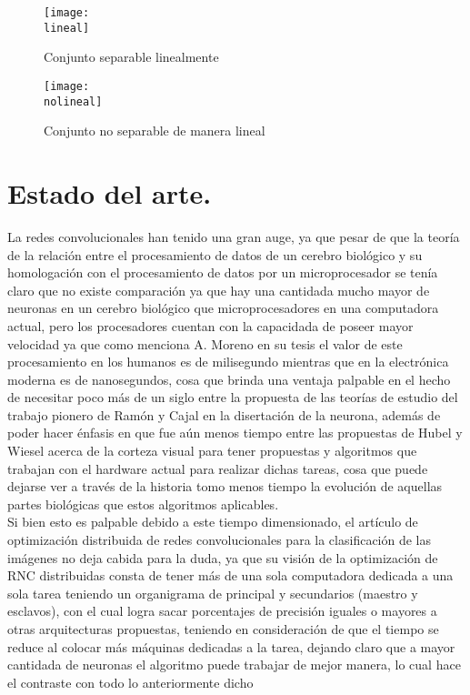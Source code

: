 \documentclass[a4paper, 12pt]{article}
\newcommand{\lineal}{img/lineal.png}
\newcommand{\nolineal}{img/nol.png}
\begin{document}
    \begin{figure}[H]
        \centering
        \texttt{[image: \\lineal]}
        \caption{Conjunto separable linealmente}
        \label{fig:lin}
    \end{figure}

    \begin{figure}[H]
        \centering
        \texttt{[image: \\nolineal]}
        \caption{Conjunto no separable de manera lineal}
        \label{fig:nolin}
    \end{figure}

    \section{Estado del arte.}
    La redes convolucionales han tenido una gran auge, ya que pesar de que la teoría de la relación entre el procesamiento de datos de un cerebro biológico y su homologación con el procesamiento de datos por un microprocesador se tenía claro que no existe comparación ya que hay una cantidada mucho mayor de neuronas en un cerebro biológico que microprocesadores en una computadora actual, pero los procesadores cuentan con la capacidada de poseer mayor velocidad ya que como menciona A. Moreno en su tesis el valor de este procesamiento en los humanos es de milisegundo mientras que en la electrónica moderna es de nanosegundos, cosa que brinda una ventaja palpable en el hecho de necesitar poco más de un siglo entre la propuesta de las teorías de estudio del trabajo pionero de Ramón y Cajal en la disertación de la neurona, además de poder hacer énfasis en que fue aún menos tiempo entre las propuestas de Hubel y Wiesel acerca de la corteza visual para tener propuestas y algoritmos que trabajan con el hardware actual para realizar dichas tareas, cosa que puede dejarse ver a través de la historia tomo menos tiempo la evolución de aquellas partes biológicas que estos algoritmos aplicables\cite{artola2019clasificacion}.\\
    Si bien esto es palpable debido a este tiempo dimensionado, el artículo de optimización distribuida de redes convolucionales para la clasificación de las imágenes no deja cabida para la duda, ya que su visión de la optimización de RNC distribuidas consta de tener más de una sola computadora dedicada a una sola tarea teniendo un organigrama de principal y secundarios (maestro y esclavos), con el cual logra sacar porcentajes de precisión iguales o mayores a otras arquitecturas propuestas, teniendo en consideración de que el tiempo se reduce al colocar más máquinas dedicadas a la tarea, dejando claro que a mayor cantidada de neuronas el algoritmo puede trabajar de mejor manera, lo cual hace el contraste con todo lo anteriormente dicho\cite{hernandez2019optimizacion}\\
\end{document}
